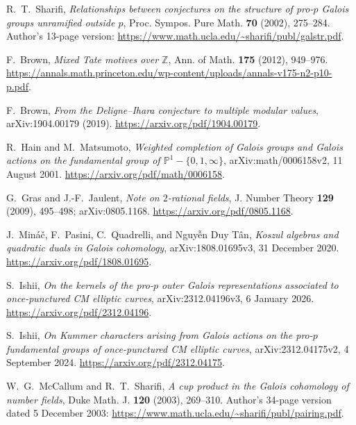 
R.~T.~Sharifi, \emph{Relationships between conjectures on the structure
of pro-$p$ Galois groups unramified outside $p$},
Proc. Sympos. Pure Math. \textbf{70} (2002), 275--284.
Author's 13-page version: \url{https://www.math.ucla.edu/~sharifi/publ/galstr.pdf}.

F.~Brown, \emph{Mixed Tate motives over $\mathbb Z$},
Ann. of Math. \textbf{175} (2012), 949--976.
\url{https://annals.math.princeton.edu/wp-content/uploads/annals-v175-n2-p10-p.pdf}.

F.~Brown, \emph{From the Deligne--Ihara conjecture to multiple modular values},
arXiv:1904.00179 (2019).
\url{https://arxiv.org/pdf/1904.00179}.

R.~Hain and M.~Matsumoto, \emph{Weighted completion of Galois groups
and Galois actions on the fundamental group of $\mathbb P^1-\{0,1,\infty\}$},
arXiv:math/0006158v2, 11 August 2001.
\url{https://arxiv.org/pdf/math/0006158}.

G.~Gras and J.-F.~Jaulent, \emph{Note on $2$-rational fields},
J. Number Theory \textbf{129} (2009), 495--498;
arXiv:0805.1168.
\url{https://arxiv.org/pdf/0805.1168}.

J.~Min\'a\v c, F.~Pasini, C.~Quadrelli, and Nguy{\~{\^e}}n Duy T\^an,
\emph{Koszul algebras and quadratic duals in Galois cohomology},
arXiv:1808.01695v3, 31 December 2020.
\url{https://arxiv.org/pdf/1808.01695}.

S.~Ishii, \emph{On the kernels of the pro-$p$ outer Galois representations
associated to once-punctured CM elliptic curves},
arXiv:2312.04196v3, 6 January 2026.
\url{https://arxiv.org/pdf/2312.04196}.

S.~Ishii, \emph{On Kummer characters arising from Galois actions on the
pro-$p$ fundamental groups of once-punctured CM elliptic curves},
arXiv:2312.04175v2, 4 September 2024.
\url{https://arxiv.org/pdf/2312.04175}.

W.~G.~McCallum and R.~T.~Sharifi,
\emph{A cup product in the Galois cohomology of number fields},
Duke Math. J. \textbf{120} (2003), 269--310.
Author's 34-page version dated 5 December 2003:
\url{https://www.math.ucla.edu/~sharifi/publ/pairing.pdf}.

